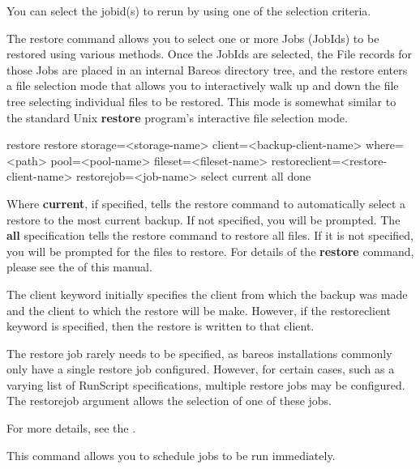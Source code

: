 \begin{description}
   You can select the jobid(s) to rerun by using one of the selection criteria.

\item [restore]
   \label{restore_command}
   The restore command allows you to select one or more Jobs (JobIds) to be
   restored using various methods.  Once the JobIds are selected, the File
   records for those Jobs are placed in an internal Bareos directory tree,
   and the restore enters a file selection mode that allows you to
   interactively walk up and down the file tree selecting individual files
   to be restored.  This mode is somewhat similar to the standard Unix {\bf
   restore} program's interactive file selection mode.

\begin{bconsole}{restore}
restore storage=<storage-name> client=<backup-client-name>
  where=<path> pool=<pool-name> fileset=<fileset-name>
  restoreclient=<restore-client-name>
  restorejob=<job-name>
  select current all done
\end{bconsole}

   Where {\bf current}, if specified, tells the restore command to
   automatically select a restore to the most current backup.  If not
   specified, you will be prompted.  The {\bf all} specification tells the
   restore command to restore all files.  If it is not specified, you will
   be prompted for the files to restore.  For details of the {\bf restore}
   command, please see the  of this
   manual.

   The client keyword initially specifies the client from which the backup
   was made and the client to which the restore will be make.  However,
   if the restoreclient keyword is specified, then the restore is written
   to that client.

   The restore job rarely needs to be specified, as bareos installations
   commonly only have a single restore job configured. However, for certain
   cases, such as a varying list of RunScript specifications, multiple
   restore jobs may be configured. The restorejob argument allows the
   selection of one of these jobs.

    For more details, see the .

\item [run]
   This command allows you to schedule jobs  to be run immediately.


\end{description}
